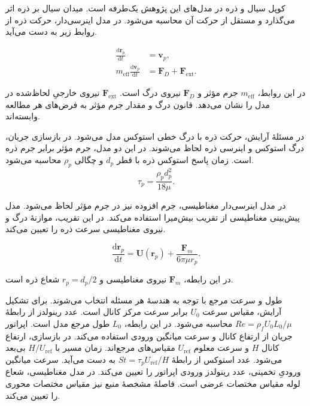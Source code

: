 کوپل سیال و ذره در مدل‌های این پژوهش یک‌طرفه است.
میدان سیال بر ذره اثر می‌گذارد و مستقل از حرکت آن محاسبه می‌شود.
در مدل اینرسی‌دار، حرکت ذره از روابط زیر به دست می‌آید.

\begin{equation}
\begin{aligned}
\frac{\mathrm d\mathbf r_p}{\mathrm dt} &= \mathbf v_p,\\
m_{\mathrm{eff}}\frac{\mathrm d\mathbf v_p}{\mathrm dt}
&= \mathbf F_D+\mathbf F_{\mathrm{ext}} .
\end{aligned}
\label{eq:theory-particle-motion}
\end{equation}

در این روابط، $m_{\mathrm{eff}}$ جرم مؤثر و $\mathbf F_D$ نیروی درگ است.
$\mathbf F_{\mathrm{ext}}$ نیروی خارجیِ لحاظ‌شده در مدل را نشان می‌دهد.
قانون درگ و مقدار جرم مؤثر به فرض‌های هر مطالعه وابسته‌اند.

در مسئلهٔ آرایش، حرکت ذره با درگ خطی استوکس مدل می‌شود.
در بازسازی جریان، درگ استوکس و اینرسی ذره لحاظ می‌شوند.
در این دو مدل، جرم مؤثر برابر جرم ذره است.
زمان پاسخ استوکس ذره با قطر $d_p$ و چگالی $\rho_p$ محاسبه می‌شود.
\begin{equation}
\tau_p=\frac{\rho_p d_p^2}{18\mu}.
\label{eq:theory-stokes-relaxation}
\end{equation}

در مدل اینرسی‌دار مغناطیسی، جرم افزوده نیز در جرم مؤثر لحاظ می‌شود.
مدل پیش‌بینی مغناطیسی از تقریب بیش‌میرا استفاده می‌کند.
در این تقریب، موازنهٔ درگ و نیروی مغناطیسی سرعت ذره را تعیین می‌کند.

\begin{equation}
\frac{\mathrm d\mathbf r_p}{\mathrm dt}
=\mathbf U(\mathbf r_p)+\frac{\mathbf F_m}{6\pi\mu r_p}.
\label{eq:theory-overdamped-motion}
\end{equation}

در این رابطه، $\mathbf F_m$ نیروی مغناطیسی و $r_p=d_p/2$ شعاع ذره است.


طول و سرعت مرجع با توجه به هندسهٔ هر مسئله انتخاب می‌شوند.
برای تشکیل آرایش، مقیاس سرعت $U_0$ برابر سرعت مرکز کانال است.
عدد رینولدز از رابطهٔ $Re=\rho_f U_0 L_0/\mu$ محاسبه می‌شود.
در این رابطه، $L_0$ طول مرجع مدل است.
اپراتور جریان از ارتفاع کانال و سرعت میانگین ورودی استفاده می‌کند.
در بازسازی، ارتفاع کانال $H$ و سرعت معلوم $U_{\mathrm{ref}}$ مقیاس‌های مرجع‌اند.
زمان مسیر با $H/U_{\mathrm{ref}}$ بی‌بعد می‌شود.
عدد استوکس از رابطهٔ $St=\tau_p U_{\mathrm{ref}}/H$ به دست می‌آید.
سرعت میانگین ورودیِ تخمینی، عدد رینولدز ورودی اپراتور را تعیین می‌کند.
در مدل مغناطیسی، شعاع لوله مقیاس مختصات عرضی است.
فاصلهٔ مشخصهٔ منبع نیز مقیاس مختصات محوری را تعیین می‌کند.

